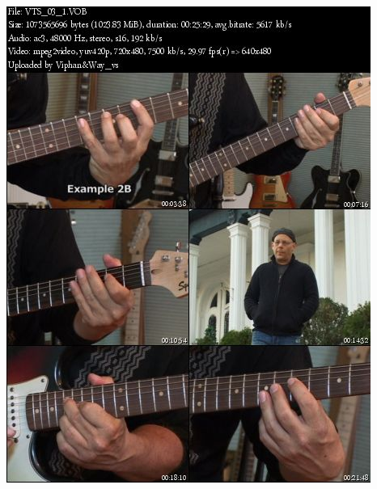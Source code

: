 \documentclass[a4paper]{book}
\begin{document}
\clearpage

\begin{center}
\includegraphics[width=11.906cm,height=15.584cm]{lebluessupportsmethodes-img137.jpg}
\end{center}



\clearpage
\end{document}
